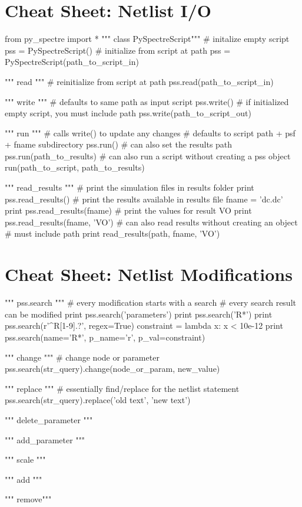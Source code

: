\documentclass[a4paper,12pt]{article}
\begin{document}
\section{Cheat Sheet: Netlist I/O}
\begin{python}
from py_spectre import *
""" class PySpectreScript"""
# initalize empty script
pss = PySpectreScript() 
# initialize from script at path
pss = PySpectreScript(path_to_script_in) 

""" read """
# reinitialize from script at path
pss.read(path_to_script_in) 

""" write """
# defaults to same path as input script
pss.write() 
# if initialized empty script, you must include path
pss.write(path_to_script_out) 

""" run """
# calls write() to update any changes
# defaults to script path + psf + fname subdirectory
pss.run()
# can also set the results path
pss.run(path_to_results)
# can also run a script without creating a pss object
run(path_to_script, path_to_results)

""" read_results """
# print the simulation files in results folder
print pss.read_results()
# print the results available in results file
fname = 'dc.dc'
print pss.read_results(fname)
# print the values for result VO
print pss.read_results(fname, 'VO')
# can also read results without creating an object
# must include path
print read_results(path, fname, 'VO')

\end{python}

\newpage
\section{Cheat Sheet: Netlist Modifications}
\begin{python}
""" pss.search """
# every modification starts with a search
# every search result can be modified
print pss.search('parameters')
print pss.search('R*')
print pss.search(r'^R[1-9].?', regex=True)
constraint = lambda x: x < 10e-12
print pss.search(name='R*', p_name='r', p_val=constraint)

""" change """
# change node or parameter
pss.search(str_query).change(node_or_param, new_value)

""" replace """
# essentially find/replace for the netlist statement
pss.search(str_query).replace('old text', 'new text')

""" delete_parameter """

""" add_parameter """

""" scale """

""" add """

""" remove"""



\end{python}
\end{document}
